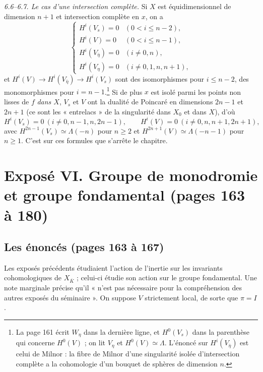 \documentclass[11pt,a4paper]{article}
\begin{document}
\emph{6.6--6.7. Le cas d'une intersection complète.} Si $X$ est équidimensionnel
de dimension $n + 1$ et intersection complète en $x$, on a
\[
  \begin{cases}
  H^i(V_s) = 0 & (0 < i \leq n - 2),\\
  H^i(V) = 0 & (0 < i \leq n - 1),\\
  H^i(V_{\bar\eta}) = 0 & (i \neq 0, n),\\
  H^i(V_\eta) = 0 & (i \neq 0, 1, n, n+1),
  \end{cases}
\]
et $H^i(V) \to H^i(V_{\bar\eta}) \to H^i(V_s)$ sont des isomorphismes pour
$i \leq n - 2$, des monomorphismes pour $i = n - 1$.\footnote{La page 161 écrit
$W_\eta$ dans la dernière ligne, et $H^0(V_s)$ dans la parenthèse qui concerne
$H^0(V)$ ; on lit $V_\eta$ et $H^0(V) \simeq \Lambda$. L'énoncé sur
$H^i(V_{\bar\eta})$ est celui de Milnor : la fibre de Milnor d'une singularité
isolée d'intersection complète a la cohomologie d'un bouquet de sphères de
dimension $n$.} Si de plus $x$ est isolé parmi les points non lisses de $f$
\emph{dans $X$}, $V_s$ et $V$ ont la dualité de Poincaré en dimensions $2n-1$ et
$2n+1$ (ce sont les « entrelacs » de la singularité dans $X_0$ et dans $X$), d'où
\[
  H^i(V_s) = 0 \ (i \neq 0, n-1, n, 2n-1), \qquad
  H^i(V) = 0 \ (i \neq 0, n, n+1, 2n+1),
\]
avec $H^{2n-1}(V_s) \simeq \Lambda(-n)$ pour $n \geq 2$ et
$H^{2n+1}(V) \simeq \Lambda(-n-1)$ pour $n \geq 1$. C'est sur ces formules que
s'arrête le chapitre.

\section*{Exposé VI. Groupe de monodromie et groupe fondamental (pages 163 à 180)}

\subsection*{Les énoncés (pages 163 à 167)}

Les exposés précédents étudiaient l'action de l'inertie sur les invariants
cohomologiques de $X_{\overline K}$ ; celui-ci étudie son action sur le groupe
fondamental. Une note marginale précise qu'il « n'est pas nécessaire pour la
compréhension des autres exposés du séminaire ». On suppose $V$ strictement
local, de sorte que $\pi = I$.
\end{document}
